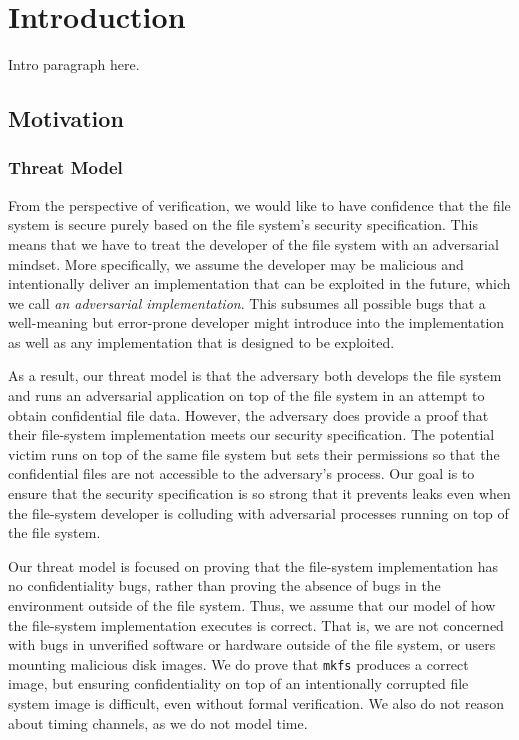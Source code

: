 \chapter{Introduction}

{\red Intro paragraph here.}

\section{Motivation}
\label{section:Motivation}

\subsection{Threat Model}
From the perspective of verification, we would like to have confidence
that the file system is secure purely based on the file system's security
specification.  This means that we have to treat the developer of the
file system with an adversarial mindset. More specifically, we assume the developer may be malicious and intentionally deliver an implementation that can be exploited in the future, which we call \emph{an adversarial implementation}.
This subsumes all possible bugs that a well-meaning but error-prone developer might introduce into the implementation as well as any implementation that is designed to be exploited.

As a result, our threat model is that the adversary both develops the
file system and runs an adversarial application on top of the file system
in an attempt to obtain confidential file data.  However, the adversary
does provide a proof that their file-system implementation meets our
security specification.  The potential victim runs on top of the same
file system but sets their permissions so that the confidential files
are not accessible to the adversary's process.  Our goal is to ensure
that the security specification is so strong that it prevents leaks even
when the file-system developer is colluding with adversarial processes
running on top of the file system.

Our threat model is focused on proving that the file-system implementation has
no confidentiality bugs, rather than proving the absence of bugs in the
environment outside of the file system. Thus, we assume that our model
of how the file-system implementation executes is correct.  That is, we are not
concerned with bugs in unverified software or hardware outside of the file
system, or users mounting malicious disk images.  We do prove that
\texttt{mkfs} produces a correct image, but ensuring confidentiality on top of an
intentionally corrupted file system image is difficult, even without formal
verification. We also do not reason about timing channels, as we do not model time.

